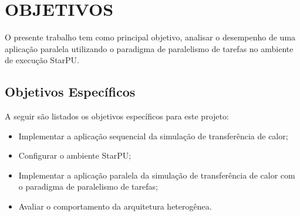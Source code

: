 
\chapter{OBJETIVOS}
\label{chap:objetivos}

O presente trabalho tem como principal objetivo, analisar o desempenho de uma aplicação paralela utilizando o paradigma de paralelismo de tarefas no ambiente de execução StarPU.

\section{Objetivos Específicos}

A seguir são listados os objetivos específicos para este projeto:\\

\begin{itemize}
    \item Implementar a aplicação sequencial da simulação de transferência de calor;
    \item Configurar o ambiente StarPU;
    \item Implementar a aplicação paralela da simulação de transferência de calor com o paradigma de paralelismo de tarefas;
    \item Avaliar o comportamento da arquitetura heterogênea.
\end{itemize}
